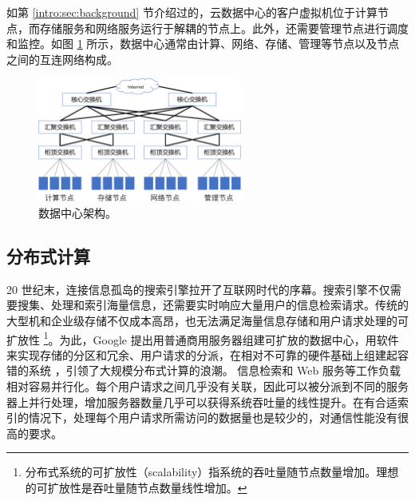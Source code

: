 如第 \ref{intro:sec:background} 节介绍过的，云数据中心的客户虚拟机位于计算节点，而存储服务和网络服务运行于解耦的节点上。此外，还需要管理节点进行调度和监控。如图 \ref{background:fig:cloud-architecture} 所示，数据中心通常由计算、网络、存储、管理等节点以及节点之间的互连网络构成。



\begin{figure}[htbp]
	\centering
	\includegraphics[width=0.6\textwidth]{figures/DC_arch.pdf}
	\caption{数据中心架构。}
	\label{background:fig:cloud-architecture}
\end{figure}





\subsection{分布式计算}
\label{background:sec:datacenter-distributed}


20 世纪末，连接信息孤岛的搜索引擎拉开了互联网时代的序幕。搜索引擎不仅需要搜集、处理和索引海量信息，还需要实时响应大量用户的信息检索请求。传统的大型机和企业级存储不仅成本高昂，也无法满足海量信息存储和用户请求处理的可扩放性 \footnote{分布式系统的可扩放性（scalability）指系统的吞吐量随节点数量增加。理想的可扩放性是吞吐量随节点数量线性增加。}。为此，Google 提出用普通商用服务器组建可扩放的数据中心，用软件来实现存储的分区和冗余、用户请求的分派，在相对不可靠的硬件基础上组建起容错的系统 \cite{ghemawat2003google,chang2008bigtable,dean2008mapreduce}，引领了大规模分布式计算的浪潮。
信息检索和 Web 服务等工作负载相对容易并行化。每个用户请求之间几乎没有关联，因此可以被分派到不同的服务器上并行处理，增加服务器数量几乎可以获得系统吞吐量的线性提升。在有合适索引的情况下，处理每个用户请求所需访问的数据量也是较少的，对通信性能没有很高的要求。

